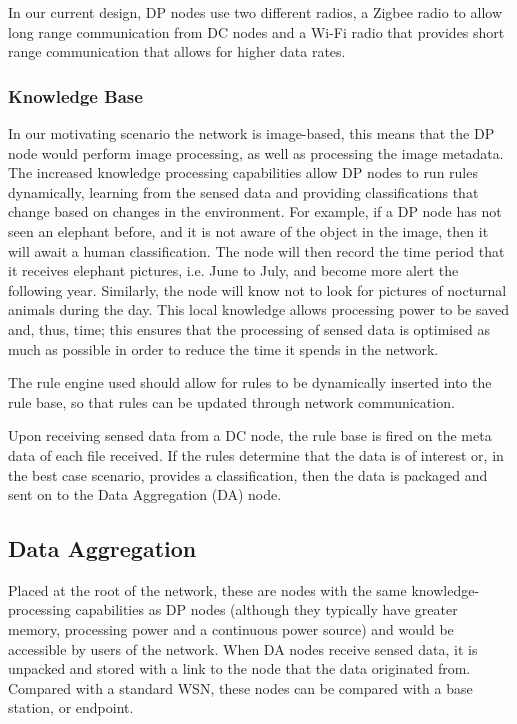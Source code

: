 	In our current design, DP nodes use two different radios, a Zigbee radio to allow long range communication from DC nodes and a Wi-Fi radio that provides short range communication that allows for higher data rates.

	\subsubsection{Knowledge Base}
	In our motivating scenario the network is image-based, this means that the DP node would perform image processing, as well as processing the image metadata. The increased knowledge processing capabilities allow DP nodes to run rules dynamically, learning from the sensed data and providing classifications that change based on changes in the environment. For example, if a DP node has not seen an elephant before, and it is not aware of the object in the image, then it will await a human classification. The node will then record the time period that it receives elephant pictures, i.e. June to July, and become more alert the following year. Similarly, the node will know not to look for pictures of nocturnal animals during the day. This local knowledge allows processing power to be saved and, thus, time; this ensures that the processing of sensed data is optimised as much as possible in order to reduce the time it spends in the network.
	
	The rule engine used should allow for rules to be dynamically inserted into the rule base, so that rules can be updated through network communication.

	Upon receiving sensed data from a DC node, the rule base is fired on the meta data of each file received. If the rules determine that the data is of interest or, in the best case scenario, provides a classification, then the data is packaged and sent on to the Data Aggregation (DA) node.
	
	\subsection{Data Aggregation}
	Placed at the root of the network, these are nodes with the same knowledge-processing capabilities as DP nodes (although they typically have greater memory, processing power and a continuous power source) and would be accessible by users of the network. When DA nodes receive sensed data, it is unpacked and stored with a link to the node that the data originated from. Compared with a standard WSN, these nodes can be compared with a base station, or endpoint.
	
